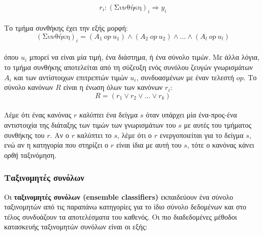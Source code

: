\begin{equation}
r_{i}: (\text{Συνθήκη})_{i} \Rightarrow y_{i}                                                                                                                                                                                                                                                                                                                                                                                                                                                                  
\end{equation}
\\
Το τμήμα συνθήκης έχει την εξής μορφή:
\begin{equation}
(\text{Συνθήκη})_i=(A_{1} \: op \: u_{1}) \wedge (A_{2} \: op \: u_{2}) \wedge \dots \wedge (A_{l} \: op \: u_{l})                                                                                                                                                                     
\end{equation} 
\\
όπου $u_{i}$ μπορεί να είναι μία τιμή, ένα διάστημα, ή ένα σύνολο τιμών. Με άλλα λόγια, το τμήμα συνθήκης αποτελείται από τη σύζευξη ενός συνόλου ζευγών γνωρισμάτων $A_{i}$ και των αντίστοιχων επιτρεπτών τιμών $u_{i}$, συνδυασμένων με έναν τελεστή $op$. Το σύνολο κανόνων $R$ είναι η ένωση όλων των κανόνων $r_{i}$:
\begin{equation}
R=(r_{1} \vee r_{2} \vee \dots \vee r_{k})                                                                                                                                                                                                                                                                                                                         
\end{equation} 
\\
Λέμε ότι ένας κανόνας $r$ \emph{καλύπτει} ένα δείγμα $s$ όταν υπάρχει μία ένα-προς-ένα αντιστοιχία της διάταξης των τιμών των γνωρισμάτων του $s$ με αυτές του τμήματος συνθήκης του $r$. Αν ο $r$ καλύπτει το $s$, λέμε ότι ο $r$ ενεργοποιείται για το δείγμα $s$, ενώ αν η κατηγορία που στηρίζει ο $r$ είναι ίδια με αυτή του $s$, τότε ο κανόνας κάνει \emph{ορθή} ταξινόμηση.

\subsubsection{Ταξινομητές συνόλων}
Οι \textbf{ταξινομητές συνόλων (ensemble classifiers)} εκπαιδεύουν ένα σύνολο ταξινομητών από τις παραπάνω κατηγορίες για το ίδιο σύνολο δεδομένων και στο τέλος συνδυάζουν τα αποτελέσματα του καθενός. Οι πιο διαδεδομένες μέθοδοι κατασκευής ταξινομητών συνόλων είναι οι εξής:

